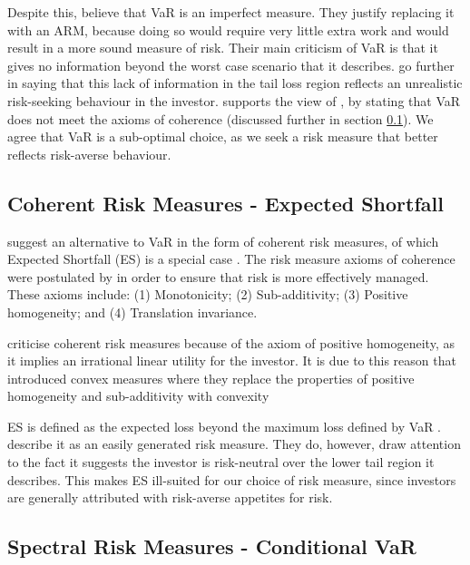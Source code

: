 \documentclass[12pt,a4paper]{article}
\begin{document}
Despite this, \cite{dowd2006after} believe that VaR is an imperfect measure. They justify replacing it with an ARM, because doing so would require very little extra work and would result in a more sound measure of risk. Their main criticism of VaR is that it gives no information beyond the worst case scenario that it describes. \cite{dowd2006after} go further in saying that this lack of information in the tail loss region reflects an unrealistic risk-seeking behaviour in the investor. \cite{ACERBI20021505} supports the view of \cite{dowd2006after}, by stating that VaR does not meet the axioms of coherence (discussed further in section \ref{subsec:ES}). We agree that VaR is a sub-optimal choice, as we seek a risk measure that better reflects risk-averse behaviour.

\subsection{Coherent Risk Measures - Expected Shortfall}
\label{subsec:ES}

\cite{dowd2006after} suggest an alternative to VaR in the form of coherent risk measures, of which Expected Shortfall (ES) is a special case \citep{ACERBI20021505}. The risk measure axioms of coherence were postulated by \cite{artzner1999coherent} in order to ensure that risk is more effectively managed. These axioms include: (1) Monotonicity; (2) Sub-additivity; (3) Positive homogeneity; and (4) Translation invariance.

\cite{CHEN20111777} criticise coherent risk measures because of the axiom of positive homogeneity, as it implies an irrational linear utility for the investor. It is due to this reason that \cite{Föllmer2002} introduced convex measures where they replace the properties of positive homogeneity and sub-additivity with convexity 

ES is defined as the expected loss beyond the maximum loss defined by VaR \citep{consiglirisk}. \cite{dowd2006after} describe it as an easily generated risk measure. They do, however, draw attention to the fact it suggests the investor is risk-neutral over the lower tail region it describes. This makes ES ill-suited for our choice of risk measure, since investors are generally attributed with risk-averse appetites for risk.

\subsection{Spectral Risk Measures - Conditional VaR}
\label{subsec:Spec}
\end{document}
